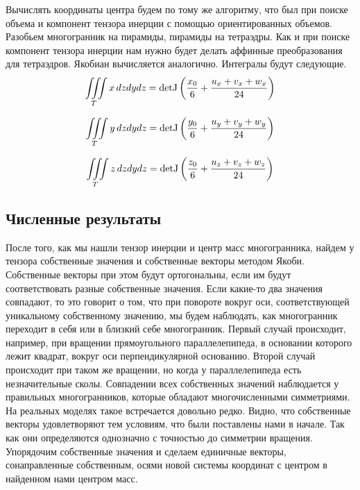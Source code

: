 \documentclass[a4paper,12pt, titlepage]{article}
\begin{document}
Вычислять координаты центра будем по тому же алгоритму, что был при поиске объема и компонент тензора инерции с помощью 
ориентированных объемов. Разобьем многогранник на пирамиды, пирамиды на тетраэдры. Как и при поиске компонент 
тензора инерции нам нужно будет делать аффинные преобразования для
тетраэдров. Якобиан вычисляется аналогично. Интегралы будут следующие.
$$
			\iiint \limits_T x \,dzdydz = {\rm detJ}\left( \frac{x_0}{6} + \frac{u_x + v_x + w_x}{24}\right)
$$

$$
			\iiint \limits_T y \,dzdydz = {\rm detJ}\left( \frac{y_0}{6} + \frac{u_y + v_y + w_y}{24}\right)
$$

$$
			\iiint \limits_T z \,dzdydz = {\rm detJ}\left( \frac{z_0}{6} + \frac{u_z + v_z + w_z}{24} \right)
$$

\subsection{Численные результаты}


После того, как мы нашли тензор инерции и центр масс многогранника,  найдем у тензора собственные значения и собственные векторы
методом Якоби. Собственные векторы при этом будут ортогональны, если им будут соответствовать разные собственные значения.
Если какие-то два значения совпадают, то это говорит о том, что при повороте вокруг оси, соответствующей  уникальному 
собственному значению, мы будем наблюдать, как многогранник переходит в себя или в близкий себе многогранник. 
Первый случай происходит, например, при вращении прямоугольного параллелепипеда, в основании которого лежит квадрат,
вокруг оси перпендикулярной основанию. Второй случай происходит при таком же вращении, но когда у параллелепипеда есть 
незначительные сколы. Совпадении всех собственных значений наблюдается у  правильных многогранников, которые обладают 
многочисленными симметриями. На реальных моделях такое встречается довольно редко. 
Видно, что собственные векторы удовлетворяют тем  условиям, что были поставлены нами в начале.
Так как они определяются однозначно с точностью до симметрии вращения. Упорядочим собственные значения и сделаем единичные 
векторы, сонаправленные собственным, осями новой системы координат с  центром в найденном нами центром масс.  
\end{document}
